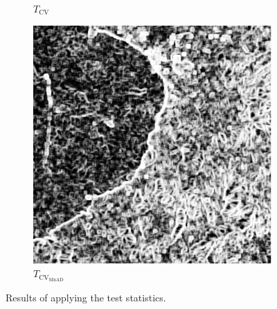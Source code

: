 \documentclass[aspectratio=1610,10pt]{beamer}
\begin{document}
\begin{frame}
\begin{figure}[H]
\begin{subfigure}[b]{0.3\textwidth}
    \caption{$T_\text{CV}$}
    \label{fig:real_images_test_Mexico-2}
  \end{subfigure}
  \hfill
  \begin{subfigure}[b]{0.3\textwidth}
    \centering
    \includegraphics[width=\textwidth]{../../Figures/PNG/mnad_mexico_512}
    \caption{$T_{\text{CV}_{\text{MnAD}}}$}
    \label{fig:real_images_test_Mexico-3}
  \end{subfigure}
  \caption{Results of applying the test statistics.}
  \label{fig:real_images_test_Mexico}
\end{figure}

\end{frame} 
\end{document}
